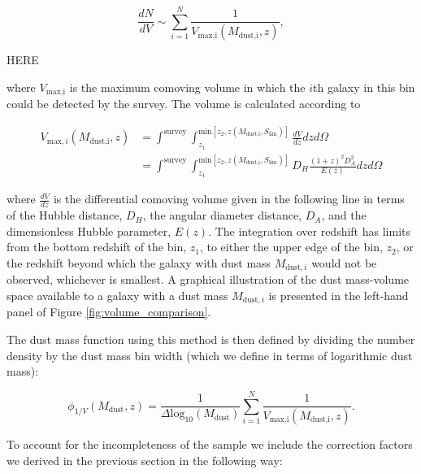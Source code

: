 \begin{equation}
    \frac{dN}{dV} \sim \sum_{i=1}^N \frac{1}{V_{\textrm{max,i}}(M_{\textrm{dust,i}},z)},
\label{eq:number_density_1/v_method}
\end{equation}

{\color{red}HERE}
 
\noindent where $V_{\textrm{max,i}}$ is the maximum comoving volume in which the $i$th galaxy in this bin could be detected by the survey. The volume is calculated according to

\begin{align}
    V_{\textrm{max},i}(M_{\textrm{dust,i}},z) &= \int^{\scriptscriptstyle \textrm{survey}} \int_{\scriptscriptstyle z_1}^{\scriptscriptstyle \textrm{min}[z_2, z(M_{\textrm{dust,i}},S_{\textrm{lim}})]} \frac{dV}{dz} dz d\Omega \nonumber \\
    &= \int^{\scriptscriptstyle \textrm{survey}} \int_{\scriptscriptstyle z_1}^{\scriptscriptstyle \textrm{min}[z_2, z(M_{\textrm{dust,i}},S_{\textrm{lim}})]} D_H \frac{(1+z)^2 D_A^2}{E(z)} dz d\Omega
\label{eq:volume_1/v_method}
\end{align}

\noindent where $\frac{dV}{dz}$ is the differential comoving volume given in the following line in terms of the Hubble distance, $D_H$, the angular diameter distance, $D_A$, and the dimensionless Hubble parameter, $E(z)$. The integration over redshift has limits from the bottom redshift of the bin, $z_1$, to either the upper edge of the bin, $z_2$, or the redshift beyond which the galaxy with dust mass $M_{\textrm{dust},i}$ would not be observed, whichever is smallest. A graphical illustration of the dust mass-volume space available to a galaxy with a dust mass $M_{\textrm{dust},i}$ is presented in the left-hand panel of Figure \ref{fig:volume_comparison}.

The dust mass function using this method is then defined by dividing the number density by the dust mass bin width (which we define in terms of logarithmic dust mass):

\begin{equation}
    \phi_{1/V}(M_{\textrm{dust}},z) = \frac{1}{\Delta \textrm{log}_{10}(M_{\textrm{dust}})} \sum_{i=1}^N \frac{1}{V_{\textrm{max,i}}(M_{\textrm{dust,i}},z)}.
\label{eq:phi_1/v_method}
\end{equation}

To account for the incompleteness of the sample we include the correction factors we derived in the previous section in the following way:

